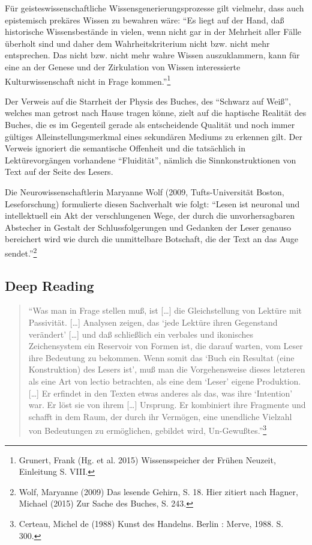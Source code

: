 \documentclass[a4paper,
fontsize=11pt,
oneside,
numbers=noperiodatend,
parskip=half-,
bibliography=totoc,
final
]{scrartcl}
\begin{document}
Für geisteswissenschaftliche Wissensgenerierungsprozesse gilt vielmehr,
dass auch epistemisch prekäres Wissen zu bewahren wäre: \enquote{Es
liegt auf der Hand, daß historische Wissensbestände in vielen, wenn
nicht gar in der Mehrheit aller Fälle überholt sind und daher dem
Wahrheitskriterium nicht bzw. nicht mehr entsprechen. Das nicht bzw.
nicht mehr wahre Wissen auszuklammern, kann für eine an der Genese und
der Zirkulation von Wissen interessierte Kulturwissenschaft nicht in
Frage kommen.}\footnote{Grunert, Frank (Hg. et al. 2015) Wissensspeicher
  der Frühen Neuzeit, Einleitung S. VIII.}

Der Verweis auf die Starrheit der Physis des Buches, des
\enquote{Schwarz auf Weiß}, welches man getrost nach Hause tragen könne,
zielt auf die haptische Realität des Buches, die es im Gegenteil gerade
als entscheidende Qualität und noch immer gültiges
Alleinstellungsmerkmal eines sekundären Mediums zu erkennen gilt. Der
Verweis ignoriert die semantische Offenheit und die tatsächlich in
Lektürevorgängen vorhandene \enquote{Fluidität}, nämlich die
Sinnkonstruktionen von Text auf der Seite des Lesers.

Die Neurowissenschaftlerin Maryanne Wolf (2009, Tufts-Universität
Boston, Leseforschung) formulierte diesen Sachverhalt wie folgt:
\enquote{Lesen ist neuronal und intellektuell ein Akt der verschlungenen
Wege, der durch die unvorhersagbaren Abstecher in Gestalt der
Schlussfolgerungen und Gedanken der Leser genauso bereichert wird wie
durch die unmittelbare Botschaft, die der Text an das Auge
sendet.}\footnote{Wolf, Maryanne (2009) Das lesende Gehirn, S. 18. Hier
  zitiert nach Hagner, Michael (2015) Zur Sache des Buches, S. 243.}

\subsection*{Deep Reading}\label{deep-reading}

\begin{quote}
\enquote{Was man in Frage stellen muß, ist {[}\ldots{}{]} die
Gleichstellung von Lektüre mit Passivität. {[}\ldots{}{]} Analysen
zeigen, das \enquote{jede Lektüre ihren Gegenstand verändert}
{[}\ldots{}{]} und daß schließlich ein verbales und ikonisches
Zeichensystem ein Reservoir von Formen ist, die darauf warten, vom Leser
ihre Bedeutung zu bekommen. Wenn somit das \enquote{Buch ein Resultat
(eine Konstruktion) des Lesers ist}, muß man die Vorgehensweise dieses
letzteren als eine Art von lectio betrachten, als eine dem
\enquote{Leser} eigene Produktion. {[}\ldots{}{]} Er erfindet in den
Texten etwas anderes als das, was ihre \enquote{Intention} war. Er löst
sie von ihrem {[}\ldots{}{]} Ursprung. Er kombiniert ihre Fragmente und
schafft in dem Raum, der durch ihr Vermögen, eine unendliche Vielzahl
von Bedeutungen zu ermöglichen, gebildet wird, Un-Gewußtes.}\footnote{Certeau,
  Michel de (1988) Kunst des Handelns. Berlin : Merve, 1988. S. 300.}
\end{quote}
\end{document}
